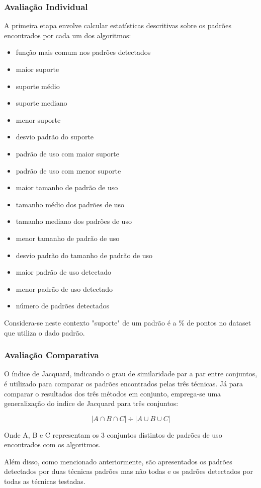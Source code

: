 \subsubsection{Avaliação Individual}
A primeira etapa envolve calcular estatísticas descritivas sobre os padrões
encontrados por cada um dos algoritmos:
\begin{itemize}
  \item função mais comum nos padrões detectados
  \item maior suporte 
  \item suporte médio 
  \item suporte mediano 
  \item menor suporte 
  \item desvio padrão do suporte 
  \item padrão de uso com maior suporte 
  \item padrão de uso com menor suporte 
  \item maior tamanho de padrão de uso
  \item tamanho médio dos padrões de uso
  \item tamanho mediano dos padrões de uso
  \item menor tamanho de padrão de uso
  \item desvio padrão do tamanho de padrão de uso
  \item maior padrão de uso detectado
  \item menor padrão de uso detectado
  \item número de padrões detectados
\end{itemize}

Considera-se neste contexto "suporte" de um padrão é a \% de pontos no dataset
que utiliza o dado padrão.

\subsubsection{Avaliação Comparativa}
O índice de Jacquard\cite{jaccard}, indicando o grau de similaridade par a par
entre conjuntos, é utilizado para comparar os padrões encontrados pelas três
técnicas. Já para comparar o resultados dos três métodos em conjunto, emprega-se
uma generalização do indice de Jacquard para três conjuntos:

\begin{equation}
  {|A \cap B \cap C|} \div {| A \cup B \cup C|}
\end{equation}

Onde A, B e C representam os 3 conjuntos distintos de padrões de uso encontrados
com os algoritmos.

Além disso, como mencionado anteriormente, são apresentados os padrões
detectados por duas técnicas padrões mas não todas e os padrões detectados por
todas as técnicas testadas.
